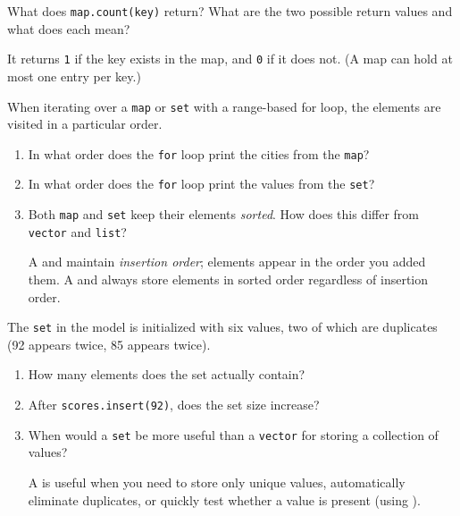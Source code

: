   \vskip -20pt

  \Q What does {\tt map.count(key)} return?  What are the two possible
    return values and what does each mean?
    \begin{answer}[0.5in]
      It returns {\tt 1} if the key exists in the map, and {\tt 0} if
      it does not.  (A map can hold at most one entry per key.)
    \end{answer}


  \Q When iterating over a {\tt map} or {\tt set} with a range-based
    for loop, the elements are visited in a particular order.\key\\[-2mm]
    \begin{enumerate}
      \itemsep 10pt
      \item In what order does the {\tt for} loop print the cities from
        the {\tt map}?
        \hfill{}

      \item In what order does the {\tt for} loop print the values from
        the {\tt set}?
        \hfill{}

      \item Both {\tt map} and {\tt set} keep their elements
        {\it sorted}.  How does this differ from {\tt vector} and {\tt list}?

        \vskip -5pt

        \begin{answer}[0.5in]
          A  and  maintain {\it insertion order};
          elements appear in the order you added them.  A 
          and  always store elements in sorted order
          regardless of insertion order.
        \end{answer}
    \end{enumerate}

  \vskip -20pt

  \Q The {\tt set} in the model is initialized with six values, two
    of which are duplicates (92 appears twice, 85 appears twice).
    \begin{enumerate}
      \itemsep 10pt
      \item How many elements does the set actually contain?
        \hfill{}

      \item After {\tt scores.insert(92)}, does the set size increase?
        \hfill{}

      \item When would a {\tt set} be more useful than a {\tt vector}
        for storing a collection of values?

        \vskip -5pt

        \begin{answer}[0.5in]
          A  is useful when you need to store only unique
          values, automatically eliminate duplicates, or quickly test
          whether a value is present (using ).
        \end{answer}
    \end{enumerate}

